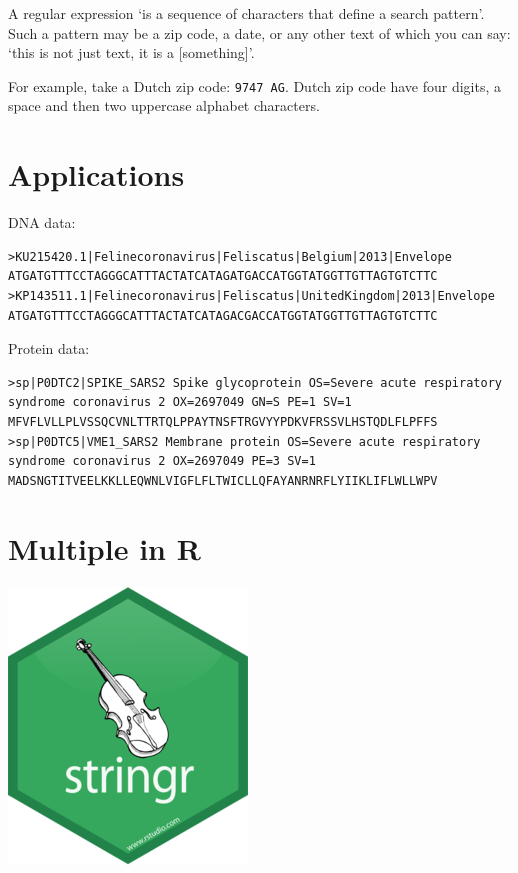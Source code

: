 \documentclass[]{book}
\begin{document}
A regular expression `is a sequence of characters that define a
search pattern'. Such a pattern may be a zip code, a date,
or any other text of which you can say: `this is not just text,
it is a {[}something{]}'.

For example, take a Dutch zip code: \texttt{9747\ AG}. Dutch zip
code have four digits, a space and then two uppercase
alphabet characters.

\hypertarget{applications}{%
\section{Applications}\label{applications}}

DNA data:

\begin{verbatim}
>KU215420.1|Felinecoronavirus|Feliscatus|Belgium|2013|Envelope
ATGATGTTTCCTAGGGCATTTACTATCATAGATGACCATGGTATGGTTGTTAGTGTCTTC
>KP143511.1|Felinecoronavirus|Feliscatus|UnitedKingdom|2013|Envelope
ATGATGTTTCCTAGGGCATTTACTATCATAGACGACCATGGTATGGTTGTTAGTGTCTTC
\end{verbatim}

Protein data:

\begin{verbatim}
>sp|P0DTC2|SPIKE_SARS2 Spike glycoprotein OS=Severe acute respiratory syndrome coronavirus 2 OX=2697049 GN=S PE=1 SV=1
MFVFLVLLPLVSSQCVNLTTRTQLPPAYTNSFTRGVYYPDKVFRSSVLHSTQDLFLPFFS
>sp|P0DTC5|VME1_SARS2 Membrane protein OS=Severe acute respiratory syndrome coronavirus 2 OX=2697049 PE=3 SV=1
MADSNGTITVEELKKLLEQWNLVIGFLFLTWICLLQFAYANRNRFLYIIKLIFLWLLWPV
\end{verbatim}

\hypertarget{multiple-in-r}{%
\section{Multiple in R}\label{multiple-in-r}}

\includegraphics{06_stringr.png}
\end{document}
